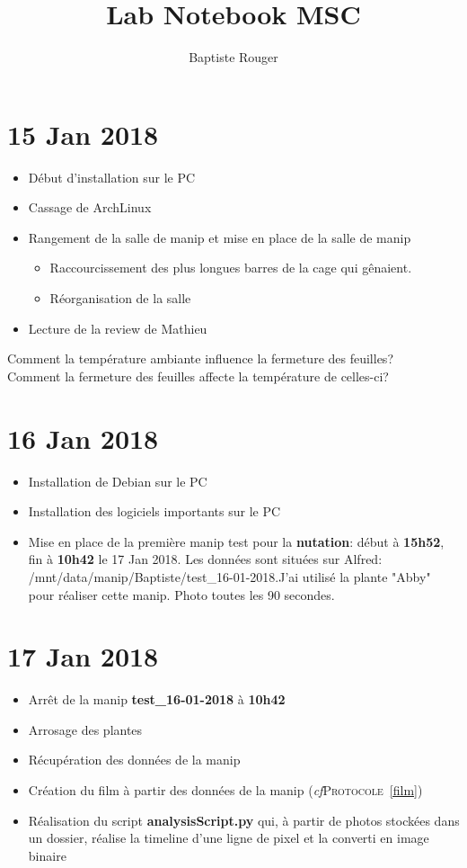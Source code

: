 \documentclass[10pt,a4paper]{article}
\author{Baptiste Rouger}
\title{Lab Notebook MSC}
\begin{document}
\maketitle

\tableofcontents

\newpage

\section{15 Jan 2018}

\begin{itemize}
    \item Début d'installation sur le PC
    \item Cassage de ArchLinux
    \item Rangement de la salle de manip et mise en place de la salle de manip
    \begin{itemize}
        \item Raccourcissement des plus longues barres de la cage qui gênaient.
        \item Réorganisation de la salle
    \end{itemize}
    \item Lecture de la review de Mathieu
\end{itemize}
\noindent Comment la température ambiante influence la fermeture des feuilles? \\
Comment la fermeture des feuilles affecte la température de celles-ci?

\section{16 Jan 2018}
\begin{itemize}
    \item Installation de Debian sur le PC
    \item Installation des logiciels importants sur le PC
    \item Mise en place de la première manip test pour la \textbf{nutation}: début à \textbf{15h52}, fin à \textbf{10h42} le 17 Jan 2018. Les données sont situées sur Alfred: /mnt/data/manip/Baptiste/test\_16-01-2018.J'ai utilisé la plante "Abby" pour réaliser cette manip. Photo toutes les 90 secondes.
\end{itemize}

\section{17 Jan 2018}
\begin{itemize}
    \item Arrêt de la manip \textbf{test\_16-01-2018} à \textbf{10h42}
    \item Arrosage des plantes
    \item Récupération des données de la manip
    \item Création du film à partir des données de la manip (\textit{cf}\textsc{Protocole}~\ref{film})
    \item Réalisation du script \textbf{analysisScript.py} qui, à partir de photos stockées dans un dossier, réalise la timeline d'une ligne de pixel et la converti en image binaire
\end{itemize}
\end{document}
